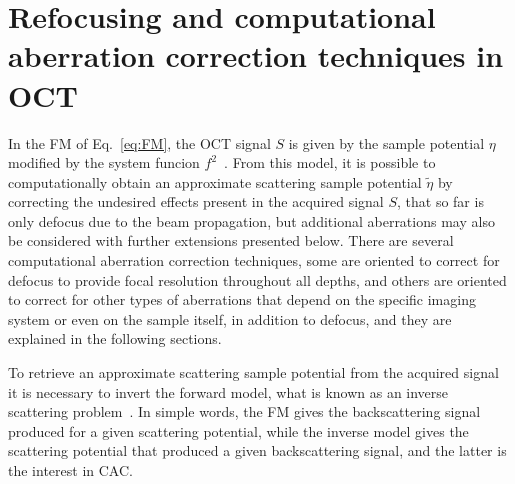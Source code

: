 \section{Refocusing and computational aberration correction techniques in OCT}\label{CAC}

In the FM of Eq.~\ref{eq:FM}, the OCT signal $S$ is given by the sample potential $\eta$ modified by the system funcion $f^2$~\cite{Marks2006_Inverse}. From this model, it is possible to computationally obtain an approximate scattering sample potential $\tilde{\eta}$ by correcting the undesired effects present in the acquired signal $S$, that so far is only defocus due to the beam propagation, but additional aberrations may also be considered with further extensions presented below. There are several computational aberration correction techniques, some are oriented to correct for defocus to provide focal resolution throughout all depths, and others are oriented to correct for other types of aberrations that depend on the specific imaging system or even on the sample itself, in addition to defocus, and they are explained in the following sections.

To retrieve an approximate scattering sample potential from the acquired signal it is necessary to invert the forward model, what is known as an inverse scattering problem~\cite{Ralston2006_Interferometric}. In simple words, the FM gives the backscattering signal produced for a given scattering potential, while the inverse model gives the scattering potential that produced a given backscattering signal, and the latter is the interest in CAC.

